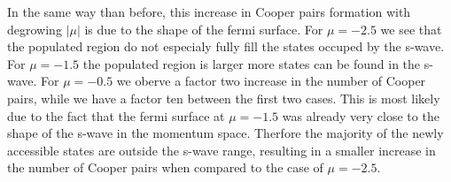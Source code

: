 \documentclass[..\main.tex]{subfile}
\begin{document}
In the same way than before, this increase in Cooper pairs formation with degrowing $|\mu|$ is due to the shape of the fermi surface.
For $\mu=-2.5$ we see that the populated region do not especialy fully fill the states occuped by the s-wave. 
For $\mu=-1.5$ the populated region is larger more states can be found in the s-wave. 
For $\mu=-0.5$ we oberve a factor two increase in the number of Cooper pairs, while we have a factor ten between the first two cases.
This is most likely due to the fact that the fermi surface at $\mu=-1.5$ was already very close to the shape of the s-wave in the momentum space.
Therfore the majority of the newly accessible states are outside the s-wave range,
resulting in a smaller increase in the number of Cooper pairs when compared to the case of $\mu=-2.5$.
\end{document}
